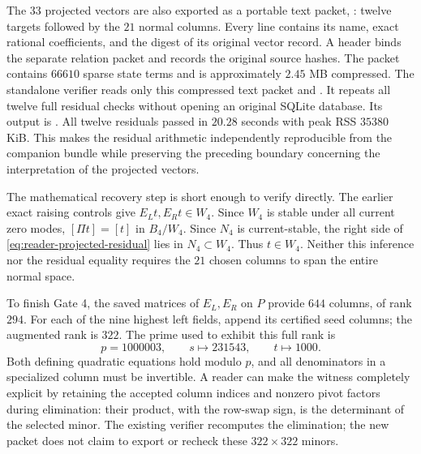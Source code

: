 The $33$ projected vectors are also exported as a portable text
packet, :
twelve targets followed by the $21$ normal columns.  Every line
contains its name, exact rational coefficients, and the digest
of its original vector record.  A header binds the separate
relation packet and records the original source hashes.
The packet contains $66610$ sparse state terms and is approximately
$2.45$ MB compressed.
The standalone verifier
reads only this compressed text packet and
.
It repeats all twelve full residual checks without opening an
original SQLite database.  Its output is
.
All twelve residuals passed in $20.28$ seconds with peak RSS
$35380$ KiB.
This makes the residual arithmetic independently reproducible
from the companion bundle while preserving the preceding
boundary concerning the interpretation of the projected vectors.

The mathematical recovery step is short enough to verify directly.
The earlier exact raising controls give $E_Lt,E_Rt\in W_4$.
Since $W_4$ is stable under all current zero modes,
$[\Pi t]=[t]$ in $B_4/W_4$.  Since $N_4$ is current-stable,
the right side of \eqref{eq:reader-projected-residual} lies in
$N_4\subset W_4$.  Thus $t\in W_4$.  Neither this inference nor
the residual equality requires the $21$ chosen columns to span
the entire normal space.

To finish Gate 4, the saved matrices of $E_L,E_R$ on $P$ provide
$644$ columns, of rank $294$.  For each of the nine highest left
fields, append its certified seed columns; the augmented rank is
$322$.  The prime used to exhibit this full rank is
\[
 p=1000003,\qquad s\longmapsto231543,\qquad
                         t\longmapsto1000.
\]
Both defining quadratic equations hold modulo $p$, and all
denominators in a specialized column must be invertible.  A reader
can make the witness completely explicit by retaining the accepted
column indices and nonzero pivot factors during elimination: their
product, with the row-swap sign, is the determinant of the selected
minor.  The existing verifier recomputes the elimination; the new
packet does not claim to export or recheck these $322\times322$
minors.

